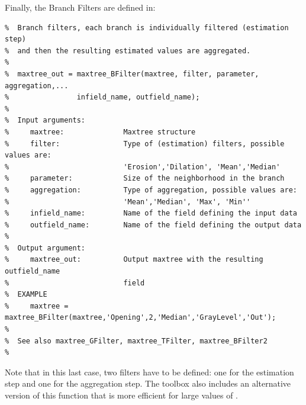 \documentclass[DIV=calc, paper=a4, fontsize=11pt]{scrartcl}	 %
\begin{document}
Finally, the Branch Filters are defined in: 
\begin{lstlisting}[aboveskip=0.5 \baselineskip]
%  maxtree_BFilter computes a Branch Filter on attributes of Maxtrees. In
%  Branch filters, each branch is individually filtered (estimation step)
%  and then the resulting estimated values are aggregated.
%
%  maxtree_out = maxtree_BFilter(maxtree, filter, parameter, aggregation,...
%                infield_name, outfield_name);
%
%  Input arguments:
%     maxtree:              Maxtree structure
%     filter:               Type of (estimation) filters, possible values are: 
%                           'Erosion','Dilation', 'Mean','Median'
%     parameter:            Size of the neighborhood in the branch
%     aggregation:          Type of aggregation, possible values are:
%                           'Mean','Median', 'Max', 'Min''
%     infield_name:         Name of the field defining the input data
%     outfield_name:        Name of the field defining the output data
%
%  Output argument:
%     maxtree_out:          Output maxtree with the resulting outfield_name
%                           field
%  EXAMPLE 
%     maxtree = maxtree_BFilter(maxtree,'Opening',2,'Median','GrayLevel','Out');
%
%  See also maxtree_GFilter, maxtree_TFilter, maxtree_BFilter2
%
\end{lstlisting}
Note that in this last case, two filters have to be defined: one for the estimation step and one for the aggregation step. The toolbox also
includes an alternative version of this function that is more efficient for large values of . 
\end{document}
